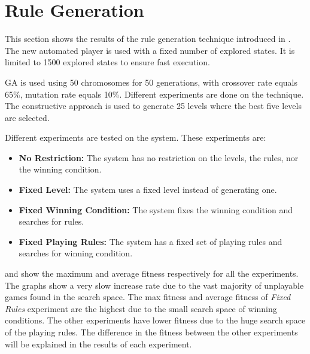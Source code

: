 \section{Rule Generation}
This section shows the results of the rule generation technique introduced in . The new automated player is used with a fixed number of explored states. It is limited to 1500 explored states to ensure fast execution.\\\par

GA is used using 50 chromosomes for 50 generations, with crossover rate equals 65\%, mutation rate equals 10\%. Different experiments are done on the technique. The constructive approach is used to generate 25 levels where the best five levels are selected.\\\par

Different experiments are tested on the system. These experiments are:
\begin{itemize}
	\item \textbf{No Restriction:} The system has no restriction on the levels, the rules, nor the winning condition.
	\item \textbf{Fixed Level:} The system uses a fixed level instead of generating one.
	\item \textbf{Fixed Winning Condition:} The system fixes the winning condition and searches for rules.
	\item \textbf{Fixed Playing Rules:} The system has a fixed set of playing rules and searches for winning condition. 
\end{itemize}

 and  show the maximum and average fitness respectively for all the experiments. The graphs show a very slow increase rate due to the vast majority of unplayable games found in the search space. The max fitness and average fitness of \emph{Fixed Rules} experiment are the highest due to the small search space of winning conditions. The other experiments have lower fitness due to the huge search space of the playing rules. The difference in the fitness between the other experiments will be explained in the results of each experiment.



